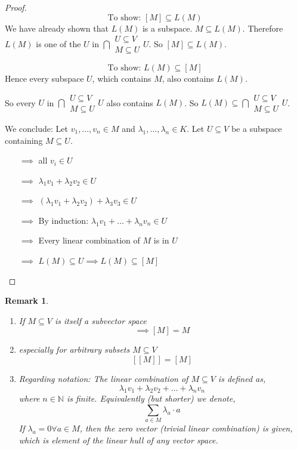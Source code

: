 \documentclass[a4paper,landscape,twocolumn]{article}
\newtheorem{rem}{Remark}[section]
\begin{document}
\begin{proof}
  \[ \text{To show: } [M] \subseteq L(M) \]
  We have already shown that $L(M)$ is a subspace. $M \subseteq L(M)$.
  Therefore $L(M)$ is one of the $U$ in $\bigcap{\substack{U \subseteq V \\ M \subseteq U}} U$.
  So $[M] \subseteq L(M)$.

  \[ \text{To show: } L(M) \subseteq [M] \]
  Hence every subspace $U$, which contains $M$, also contains $L(M)$.

  So every $U$ in $\bigcap{\substack{U \subseteq V \\ M \subseteq U}} U$ also contains $L(M)$.
  So $L(M) \subseteq \bigcap{\substack{U \subseteq V \\ M \subseteq U}} U$.

  We conclude: Let $v_1, \ldots, v_n \in M$ and $\lambda_1, \ldots, \lambda_n \in K$.
  Let $U \subseteq V$ be a subspace containing $M \subseteq U$.

  \begin{itemize}
    \item[$\implies$]
      all $v_i \in U$
    \item[$\implies$]
      $\lambda_1 v_1 + \lambda_2 v_2 \in U$
    \item[$\implies$]
      $(\lambda_1 v_1 + \lambda_2 v_2) + \lambda_3 v_3 \in U$
    \item[$\implies$]
      By induction: $\lambda_1 v_1 + \ldots + \lambda_n v_n \in U$
    \item[$\implies$]
      Every linear combination of $M$ is in $U$
    \item[$\implies$]
      $L(M) \subseteq U \implies L(M) \subseteq [M]$
  \end{itemize}
\end{proof}

\begin{rem}
  \begin{enumerate}
    \item If $M \subseteq V$ is itself a subvector space
      \[ \implies [M] = M \]
    \item especially for arbitrary subsets $M \subseteq V$
      \[ \left[[M]\right] = [M] \]
    \item Regarding notation: The linear combination of $M \subseteq V$
      is defined as,
      \[ \lambda_1 v_1 + \lambda_2 v_2 + \ldots + \lambda_n v_n \]
      where $n \in \mathbb N$ is finite. Equivalently (but shorter) we denote,
      \[ \sum_{a \in M} \lambda_a \cdot a \]
      If $\lambda_a = 0 \forall a \in M$, then the zero vector
      (\emph{trivial} linear combination) is given, which is element of the linear hull
      of any vector space.
  \end{enumerate}
\end{rem}
\end{document}
